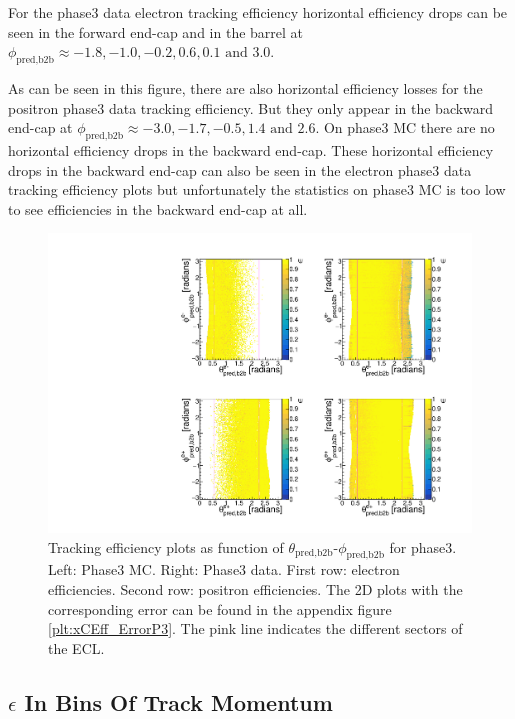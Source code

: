 \documentclass[a4paper,11pt,twosided,final,german,openbib,pdftex,listof=totoc,bibliography=totoc]{scrbook}
\begin{document}
For the phase3 data electron tracking efficiency horizontal efficiency drops can be seen in the forward end-cap and in the barrel at $\phi_{\textrm{pred,b2b}} \approx -1.8, -1.0, -0.2, 0.6, 0.1 \textrm{ and }3.0$.

As can be seen in this figure, there are also horizontal efficiency losses for the positron phase3 data tracking efficiency. But they only appear in the backward end-cap at $\phi_{\textrm{pred,b2b}} \approx -3.0, -1.7, -0.5, 1.4 \textrm{ and } 2.6$. On phase3 MC there are no horizontal efficiency drops in the backward end-cap. These horizontal efficiency drops in the backward end-cap can also be seen in the electron phase3 data tracking efficiency plots but unfortunately the statistics on phase3 MC is too low to see efficiencies in the backward end-cap at all.


\begin{figure}[!htbp]
	\centering
	\includegraphics[width=\textwidth]{Plots/master3/xCEffTP_MCDataP3.pdf}
	\caption[$\theta_{\textrm{pred,b2b}}$-$\phi_{\textrm{pred,b2b}}$ Efficiency Plots Phase3]{Tracking efficiency plots as function of $\theta_{\textrm{pred,b2b}}$-$\phi_{\textrm{pred,b2b}}$ for phase3. Left: Phase3 MC. Right: Phase3 data. First row: electron efficiencies. Second row: positron efficiencies. The 2D plots with the corresponding error can be found in the appendix figure \ref{plt:xCEff_ErrorP3}. The pink line indicates the different sectors of the ECL.}
	\label{plt:xCEff3}
\end{figure}

\clearpage


\subsection{$\epsilon$ In Bins Of Track Momentum}
\end{document}
